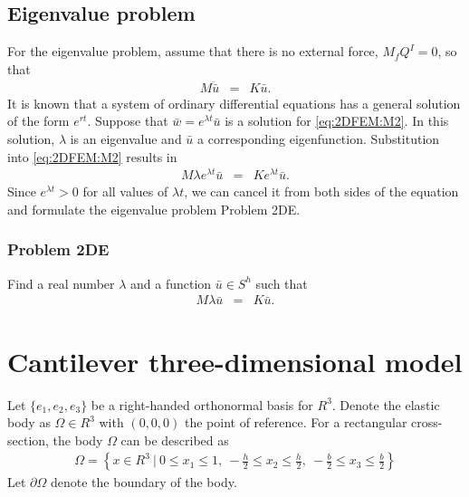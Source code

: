 \subsection*{Eigenvalue problem}\label{2dFEM_EP}
For the eigenvalue problem, assume that there is no external force, $M_{f}Q^I = 0$, so that 
\begin{eqnarray}
		M\ddot{\bar{u}} & = & K\bar{u}.\label{eq:2DFEM:M2}
\end{eqnarray}
It is known that a system of ordinary differential equations has a general solution of the form $e^{rt}$. Suppose that $\bar{w} = e^{\lambda t} \bar{u}$ is a solution for \eqref{eq:2DFEM:M2}. In this solution, $\lambda$ is an eigenvalue and $\bar{u}$ a corresponding eigenfunction. Substitution into \eqref{eq:2DFEM:M2} results in
\begin{eqnarray*}
	M\lambda e^{\lambda t}\bar{u} & = & Ke^{\lambda t}\bar{u}.
\end{eqnarray*}
Since $e^{\lambda t} > 0$ for all values of $\lambda t$, we can cancel it from both sides of the equation and formulate the eigenvalue problem Problem 2DE.

\subsubsection*{Problem 2DE}
Find a real number $\lambda$ and a function $\bar{u} \in S^h$ such that
\begin{eqnarray}
	M\lambda{\bar{u}} & = & K\bar{u}.
\end{eqnarray}


\section{Cantilever three-dimensional model} \label{ssec:3D_Model:FEM}
Let $\{e_1,e_2,e_3\}$ be a right-handed orthonormal basis for $R^3$. Denote the elastic body as $\Omega \in R^3$ with $(0,0,0)$ the point of reference. For a rectangular cross-section, the body $\Omega$ can be described as
\begin{eqnarray*}
	\Omega = \left\{ x \in R^3 \ | \ 0 \leq x_1 \leq 1, \ -\frac{h}{2} \leq x_2 \leq \frac{h}{2} , \ -\frac{b}{2} \leq x_3 \leq \frac{b}{2}\right \}
\end{eqnarray*}
Let $\partial \Omega$ denote the boundary of the body.

